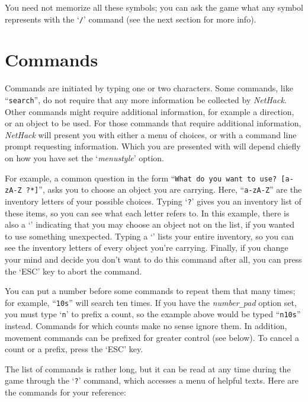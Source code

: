 \elist
You need not memorize all these symbols; you can ask the game what any
symbol represents with the `{\tt /}' command (see the next section for
more info).

\section{Commands}

Commands are initiated by typing one or two characters.  Some commands,
like ``{\tt search}'', do not require that any more information be collected
by {\it NetHack\/}.  Other commands might require additional information, for
example a direction, or an object to be used.  For those commands that
require additional information, {\it NetHack\/} will present you with either 
a menu of choices, or with a command line prompt requesting information.  Which
you are presented with will depend chiefly on how you have set the
`{\it menustyle\/}'
option.

For example, a common question in the form ``{\tt What do you want to
use? [a-zA-Z\ ?*]}'', asks you to choose an object you are carrying.
Here, ``{\tt a-zA-Z}'' are the inventory letters of your possible choices.
Typing `{\tt ?}' gives you an inventory list of these items, so you can see
what each letter refers to.  In this example, there is also a `{\tt *}'
indicating that you may choose an object not on the list, if you
wanted to use something unexpected.  Typing a `{\tt *}' lists your entire
inventory, so you can see the inventory letters of every object you're
carrying.  Finally, if you change your mind and decide you don't want
to do this command after all, you can press the `ESC' key to abort the
command.

You can put a number before some commands to repeat them that many
times; for example, ``{\tt 10s}'' will search ten times.  If you have the
{\it number\verb+_+pad\/}
option set, you must type `{\tt n}' to prefix a count, so the example above
would be typed ``{\tt n10s}'' instead.  Commands for which counts make no
sense ignore them.  In addition, movement commands can be prefixed for
greater control (see below).  To cancel a count or a prefix, press the
`ESC' key.

The list of commands is rather long, but it can be read at any time
during the game through the `{\tt ?}' command, which accesses a menu of
helpful texts.  Here are the commands for your reference:

